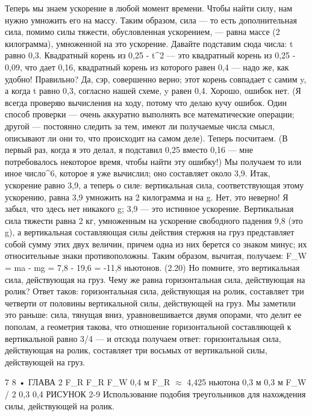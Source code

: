 \documentclass[10pt,oneside]{article}
\begin{document}
Теперь мы знаем ускорение в любой момент времени. Чтобы найти силу, нам нужно умножить его на массу. Таким образом, сила --- то есть дополнительная сила, помимо силы тяжести, обусловленная ускорением, --- равна массе (2 килограмма), умноженной на это ускорение. Давайте подставим сюда числа: t равно 0,3. Квадратный корень из 0,25 - t\textasciicircum{}2 --- это квадратный корень из 0,25 - 0,09, что дает 0,16, квадратный корень из которого равен 0,4 --- надо же, как удобно! Правильно? Да, сэр, совершенно верно; этот корень совпадает с самим y, а когда t равно 0,3, согласно нашей схеме, y равен 0,4. Хорошо, ошибок нет. (Я всегда проверяю вычисления на ходу, потому что делаю кучу ошибок. Один способ проверки --- очень аккуратно выполнять все математические операции; другой --- постоянно следить за тем, имеют ли получаемые числа смысл, описывают ли они то, что происходит на самом деле). Теперь посчитаем. (В первый раз, когда я это делал, я подставил 0,25 вместо 0,16 --- мне потребовалось некоторое время, чтобы найти эту ошибку!) Мы получаем то или иное число\textasciicircum{}6, которое я уже вычислил; оно составляет около 3,9. Итак, ускорение равно 3,9, а теперь о силе: вертикальная сила, соответствующая этому ускорению, равна 3,9 умножить на 2 килограмма и на g. Нет, это неверно! Я забыл, что здесь нет никакого g; 3,9 --- это истинное ускорение. Вертикальная сила тяжести равна 2 кг, умноженным на ускорение свободного падения 9,8 (это g), а вертикальная составляющая силы действия стержня на груз представляет собой сумму этих двух величин, причем одна из них берется со знаком минус; их относительные знаки противоположны. Таким образом, вычитая, получаем: F\_W = ma - mg = 7,8 - 19,6 = -11,8 ньютонов. (2.20) Но помните, это вертикальная сила, действующая на груз. Чему же равна горизонтальная сила, действующая на ролик? Ответ таков: горизонтальная сила, действующая на ролик, составляет три четверти от половины вертикальной силы, действующей на груз. Мы заметили это раньше: сила, тянущая вниз, уравновешивается двумя опорами, что делит ее пополам, а геометрия такова, что отношение горизонтальной составляющей к вертикальной равно 3/4 --- и отсюда получаем ответ: горизонтальная сила, действующая на ролик, составляет три восьмых от вертикальной силы, действующей на груз.\par

7 8 • ГЛАВА 2 F\_R F\_R F\_W 0,4 м F\_R \ensuremath{\approx} 4,425 ньютона 0,3 м 0,3 м F\_W / 2 0,3 0,4 РИСУНОК 2-9 Использование подобия треугольников для нахождения силы, действующей на ролик.\par
\end{document}
